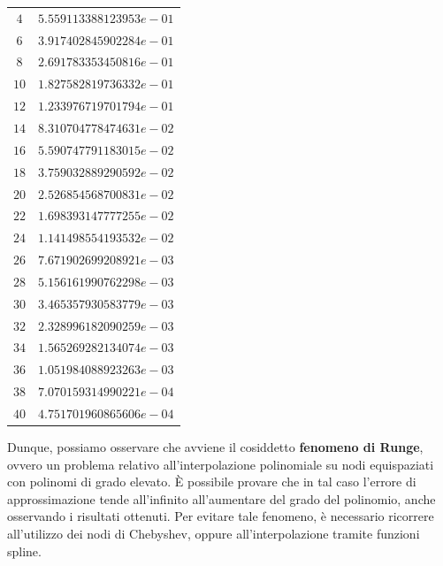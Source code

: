 \begin{table}[H]
\begin{minipage}{0.5\textwidth}
\begin{tabular}{|c|c|}
			$4$  & $5.559113388123953e-01$ \\
			$6$  & $3.917402845902284e-01$ \\
			$8$  & $2.691783353450816e-01$ \\
			$10$ & $1.827582819736332e-01$ \\
			$12$ & $1.233976719701794e-01$ \\
			$14$ & $8.310704778474631e-02$ \\
			$16$ & $5.590747791183015e-02$ \\
			$18$ & $3.759032889290592e-02$ \\
			$20$ & $2.526854568700831e-02$ \\
			$22$ & $1.698393147777255e-02$ \\
			$24$ & $1.141498554193532e-02$ \\
			$26$ & $7.671902699208921e-03$ \\
			$28$ & $5.156161990762298e-03$ \\
			$30$ & $3.465357930583779e-03$ \\
			$32$ & $2.328996182090259e-03$ \\
			$34$ & $1.565269282134074e-03$ \\
			$36$ & $1.051984088923263e-03$ \\
			$38$ & $7.070159314990221e-04$ \\
			$40$ & $4.751701960865606e-04$ \\
			\hline
		\end{tabular}
	\end{minipage}
\end{table}

Dunque, possiamo osservare che avviene il cosiddetto \textbf{fenomeno di Runge}, ovvero un problema relativo all'interpolazione polinomiale su nodi equispaziati con polinomi
di grado elevato. È possibile provare che in tal caso l'errore di approssimazione tende all'infinito all'aumentare del grado del polinomio, anche osservando i risultati ottenuti.
Per evitare tale fenomeno, è necessario ricorrere all'utilizzo dei nodi di Chebyshev, oppure all'interpolazione tramite funzioni spline.
